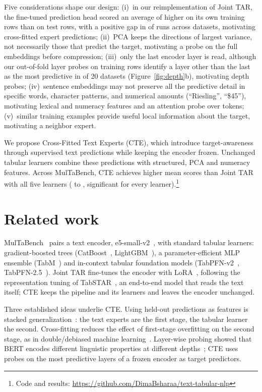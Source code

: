 \documentclass{article}
\begin{document}
Five considerations shape our design: (i)~in our reimplementation of Joint TAR, the fine-tuned prediction head
scored an average of \leakGap{} higher on its own training rows than on test rows, with a positive gap in \leakPos{}
of \leakN{} runs across \leakDatasets{} datasets, motivating cross-fitted expert predictions; (ii)~PCA keeps the directions of
largest variance, not necessarily those that predict the target, motivating a probe on the full embeddings before
compression; (iii)~only the last encoder layer is read, although our out-of-fold layer probes on training rows
identify a layer other than the last as the most predictive in \depthInner{} of 20 datasets (Figure~\ref{fig:depth}b), motivating depth probes;
(iv)~sentence embeddings may not preserve all the predictive detail in specific words, character patterns, and
numerical amounts (``Riesling'', ``\$45''), motivating lexical and numeracy features and an attention probe over tokens; (v)~similar training examples
provide useful local information about the target, motivating a neighbor expert.

We propose Cross-Fitted Text Experts (CTE), which introduce target-awareness through supervised text predictions
while keeping the encoder frozen. Unchanged tabular learners combine these predictions with structured, PCA and
numeracy features. Across MulTaBench, CTE achieves higher mean scores than Joint TAR with all five
learners (\gainMin{} to \gainMax{}, significant for every learner).\footnote{Code and results: \url{https://github.com/DimaBsharaa/text-tabular-nlp}}

\section{Related work}
\label{sec:related}
MulTaBench~\citep{arazi2026multabench} pairs a text encoder, e5-small-v2~\citep{wang2022e5}, with standard tabular
learners: gradient-boosted trees (CatBoost~\citep{prokhorenkova2018catboost}, LightGBM~\citep{ke2017lightgbm}), a
parameter-efficient MLP ensemble (TabM~\citep{gorishniy2025tabm}) and in-context tabular foundation models
(TabPFN-v2~\citep{hollmann2025tabpfnv2}, TabPFN-2.5~\citep{grinsztajn2025tabpfn25}). Joint TAR fine-tunes the encoder
with LoRA~\citep{hu2022lora}, following the representation tuning of TabSTAR~\citep{arazi2025tabstar}, an end-to-end
model that reads the text itself; CTE keeps the pipeline and its learners and leaves the encoder unchanged.

Three established ideas underlie CTE. Using held-out predictions as features is stacked
generalization~\citep{wolpert1992stacked,breiman1996stacked}: the text experts are the first stage, the tabular
learner the second. Cross-fitting reduces the effect of first-stage overfitting on the second stage, as in double/debiased machine
learning~\citep{chernozhukov2018dml}. Layer-wise probing showed that BERT encodes different linguistic properties at
different depths~\citep{tenney2019bert}; CTE uses probes on the most predictive layers of a frozen encoder as target
predictors.
\end{document}
